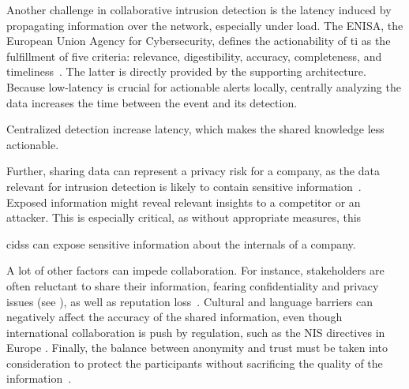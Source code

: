 Another challenge in collaborative intrusion detection is the latency induced by propagating information over the network, especially under load.
The ENISA, the European Union Agency for Cybersecurity, defines the actionability of \gls{ti} as the fulfillment of five criteria: relevance, digestibility, accuracy, completeness, and timeliness~\cite{ENISA2014}.
The latter is directly provided by the supporting architecture.
Because low-latency is crucial for actionable alerts locally, centrally analyzing the data increases the time between the event and its detection.

\begin{challenge}
  Centralized detection increase latency, which makes the shared knowledge less actionable.
  \label{chall:actionability}
\end{challenge}

Further, sharing data can represent a privacy risk for a company, as the data relevant for intrusion detection is likely to contain sensitive information~\cite{zhou_surveycoordinatedattacks_2010}.
Exposed information might reveal relevant insights to a competitor or an attacker.
This is especially critical, as without appropriate measures, this 


\begin{challenge}
  \Glspl{cids} can expose sensitive information about the internals of a company.
  \label{chall:privacy}
\end{challenge}

A lot of other factors can impede collaboration.
For instance, stakeholders are often reluctant to share their information, fearing confidentiality and privacy issues (see ), as well as reputation loss~\cite{pala_InformationSharingCybersecurity_2019}.
Cultural and language barriers can negatively affect the accuracy of the shared information, even though international collaboration is push by regulation, such as the NIS directives in Europe \cite{NIS_directive,NIS2}.
Finally, the balance between anonymity and trust must be taken into consideration to protect the participants without sacrificing the quality of the information~\cite{murdoch_AnonymityvsTrust_2015}.

